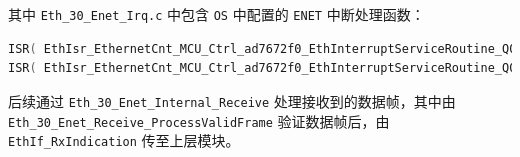 其中 \lstinline{Eth_30_Enet_Irq.c} 中包含 \lstinline{OS} 中配置的 \lstinline{ENET} 中断处理函数：

\begin{lstlisting}[language=C]
ISR( EthIsr_EthernetCnt_MCU_Ctrl_ad7672f0_EthInterruptServiceRoutine_Q0Rx );
ISR( EthIsr_EthernetCnt_MCU_Ctrl_ad7672f0_EthInterruptServiceRoutine_Q0Tx );
\end{lstlisting}

后续通过 \lstinline{Eth_30_Enet_Internal_Receive} 处理接收到的数据帧，其中由 \lstinline{Eth_30_Enet_Receive_ProcessValidFrame} 验证数据帧后，由 \lstinline{EthIf_RxIndication} 传至上层模块。

